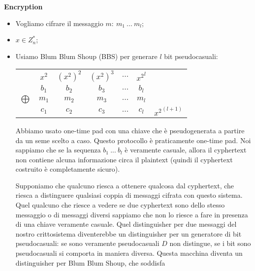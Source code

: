 \noindent \textbf{Encryption}
\begin{itemize}
    \item Vogliamo cifrare il messaggio $m: \ m_1 \ ... \ m_l$;
    \item $x \in Z_n^*$;
    \item Usiamo Blum Blum Shoup (BBS) per generare $l$ bit pseudocasuali:
    \begin{center}
            \begin{tabular}{ c c c c c c c }
              & $x^2$ & ${(x^2)}^2$ & ${(x^2)}^3$ & $...$ & ${x^2}^{l}$ & \\
              & $b_1$ & $b_2$ & $b_3$ & $...$ & $b_l$ & \\
              $\bigoplus$ & $m_1$ & $m_2$ & $m_3$ & $...$ & $m_l$ & \\
              \hline
              & $c_1$ & $c_2$ & $c_3$ & $...$ & $c_l$ & ${x^2}^{(l+1)}$ \\
            \end{tabular}
        \end{center}

        \noindent Abbiamo usato one-time pad con una chiave che è pseudogenerata a partire da un seme scelto a caso. Questo protocollo è praticamente one-time pad. Noi sappiamo che se la sequenza $b_1 \ ... \ b_l$ è veramente casuale, allora il cyphertext non contiene alcuna informazione circa il plaintext (quindi il cyphertext costruito è completamente sicuro).

        Supponiamo che qualcuno riesca a ottenere qualcosa dal cyphertext, che riesca a distinguere qualsiasi coppia di messaggi cifrata con questo sistema. Quel qualcuno che riesce a vedere se due cyphertext sono dello stesso messaggio o di messaggi diversi sappiamo che non lo riesce a fare in presenza di una chiave veramente casuale. Quel distinguisher per due messaggi del nostro crittosistema diventerebbe un distinguisher per un generatore di bit pseudocasuali: se sono veramente pseudocasuali $D$ non distingue, se i bit sono pseudocasuali si comporta in maniera diversa. Questa macchina diventa un distinguisher per Blum Blum Shoup, che soddisfa 
\end{itemize}
















